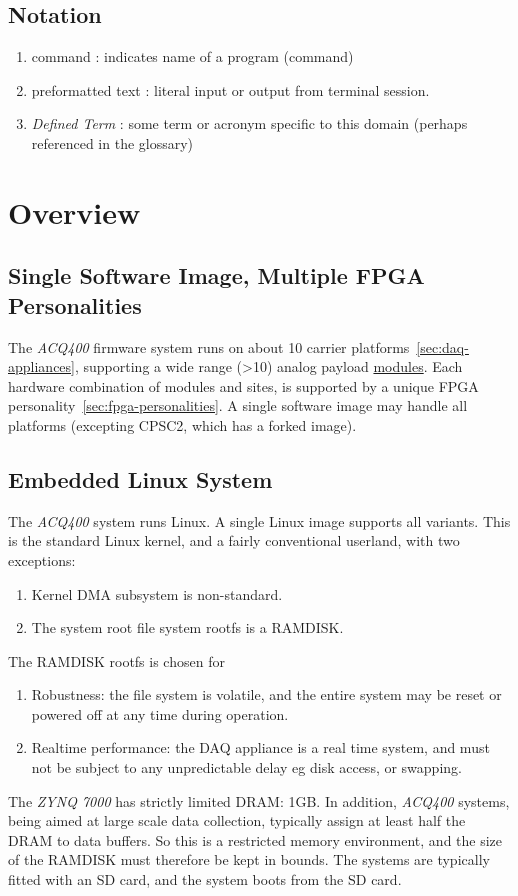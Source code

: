 \documentclass[]{article}
\newcommand{\glossy}[1]{{\color{blue}\itshape #1}}
\begin{document}
\subsection{Notation}
\begin{enumerate}
    \item command   : indicates name of a program (command)
    \item preformatted text : literal input or output from terminal session.
    \item \glossy{Defined Term} : some term or acronym specific to this domain (perhaps referenced in the glossary)
\end{enumerate} 

\section{Overview}

\subsection{Single Software Image, Multiple FPGA Personalities}
The \glossy{ACQ400} firmware system runs on about 10 carrier platforms~\ref{sec:daq-appliances}, supporting a wide range (>10) analog payload \href{https://www.d-tacq.com/modproducts_modules.shtml}{modules}.  Each hardware combination of modules and sites, is supported by a unique FPGA personality~\ref{sec:fpga-personalities}. A single software image may handle all platforms (excepting CPSC2, which has a forked image).

\subsection{Embedded Linux System}
The \glossy{ACQ400} system runs Linux. A single Linux image supports all variants. This is the standard Linux kernel, and a fairly conventional userland, with two exceptions:
\begin{enumerate}
    \item Kernel DMA subsystem is non-standard.
    \item The system root file system rootfs is a RAMDISK. 
\end{enumerate} 

The RAMDISK rootfs is chosen for 
\begin{enumerate}
    \item Robustness: the file system is volatile, and the entire system may be reset or powered off at any time during operation. 
    \item Realtime performance: the DAQ appliance is a real time system, and must not be subject to any unpredictable delay eg disk access, or swapping.
\end{enumerate} 
The \glossy{ZYNQ 7000} has strictly limited DRAM: 1GB. In addition, \glossy{ACQ400} systems, being aimed at large scale data collection, typically assign at least half the DRAM to data buffers. So this is a restricted memory environment, and the size of the RAMDISK must therefore be kept in bounds.
The systems are typically fitted with an SD card, and the system boots from the SD card.
\end{document}
